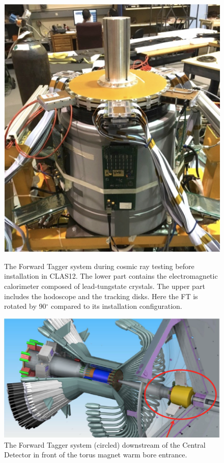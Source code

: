\documentclass[final,3p,twocolumn]{elsarticle}
\begin{document}
\begin{figure}[t!]
\centerline{\includegraphics[width=0.70\columnwidth]{FT-photo.png}}
\caption{The Forward Tagger system during cosmic ray testing before installation in CLAS12. The lower part contains
the electromagnetic calorimeter composed of lead-tungstate crystals. The upper part includes the hodoscope and the
tracking disks. Here the FT is rotated by 90$^\circ$ compared to its installation configuration.}
\label{ft-photo}
\vspace{1cm}\centerline{\includegraphics[width=1.0\columnwidth]{CD-FT.png}}
\caption{The Forward Tagger system (circled) downstream of the Central Detector in front of the torus magnet
  warm bore entrance.}
\label{ft}
\end{figure}
\end{document}

